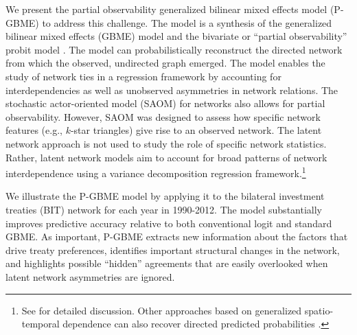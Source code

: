 
We present the partial observability generalized bilinear mixed effects model (P-GBME) to address this challenge.  The model is a synthesis of the generalized bilinear mixed effects (GBME) model \citep{hoff:2005} and the bivariate or ``partial observability'' probit model \citep{poirier:1980, przeworski:vreel:2002}. The model can probabilistically reconstruct the directed network from which the observed, undirected graph emerged. The model enables the study of network ties in a regression framework by accounting for interdependencies as well as unobserved asymmetries in network relations. The stochastic actor-oriented model (SAOM) for networks \citep{snijders:pickup:2017} also allows for partial observability. However, SAOM was designed to assess how specific network features (e.g., $k$-star triangles) give rise to an observed network. The latent network approach is not used to study the role of specific network statistics.  Rather, latent network models aim to account for broad patterns of network interdependence using a variance decomposition regression framework.\footnote{See \citet{minhas:etal:2016:arxiv} for detailed discussion. Other approaches based on generalized spatio-temporal dependence can also recover directed predicted probabilities \citet{franzese:etal:2012}.}

We illustrate the P-GBME model by applying it to the bilateral investment treaties (BIT) network for each year in 1990-2012. The model substantially improves predictive accuracy relative to both conventional logit and standard GBME. As important, P-GBME extracts new information about the factors that drive treaty preferences, identifies important structural changes in the network, and highlights possible ``hidden'' agreements that are easily overlooked when latent network asymmetries are ignored.
